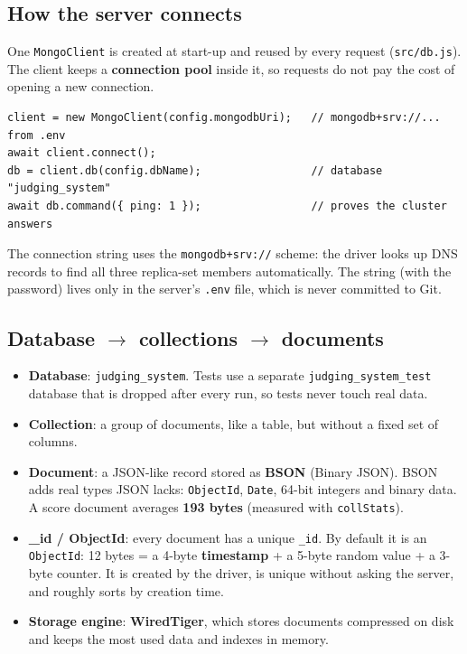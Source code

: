 \documentclass[11pt,a4paper]{article}
\begin{document}
\subsection{How the server connects}
One \texttt{MongoClient} is created at start-up and reused by every request (\texttt{src/db.js}). The client keeps a
\textbf{connection pool} inside it, so requests do not pay the cost of opening a new connection.

\begin{lstlisting}
client = new MongoClient(config.mongodbUri);   // mongodb+srv://... from .env
await client.connect();
db = client.db(config.dbName);                 // database "judging_system"
await db.command({ ping: 1 });                 // proves the cluster answers
\end{lstlisting}

The connection string uses the \texttt{mongodb+srv://} scheme: the driver looks up DNS records to find all three
replica-set members automatically. The string (with the password) lives only in the server's \texttt{.env} file,
which is never committed to Git.

\subsection{Database $\rightarrow$ collections $\rightarrow$ documents}
\begin{itemize}[leftmargin=1.4em]
  \item \textbf{Database}: \texttt{judging\_system}. Tests use a separate \texttt{judging\_system\_test} database that is
        dropped after every run, so tests never touch real data.
  \item \textbf{Collection}: a group of documents, like a table, but without a fixed set of columns.
  \item \textbf{Document}: a JSON-like record stored as \textbf{BSON} (Binary JSON). BSON adds real types JSON lacks:
        \texttt{ObjectId}, \texttt{Date}, 64-bit integers and binary data. A score document averages \textbf{193 bytes}
        (measured with \texttt{collStats}).
  \item \textbf{\_id / ObjectId}: every document has a unique \texttt{\_id}. By default it is an \texttt{ObjectId}:
        12 bytes = a 4-byte \textbf{timestamp} + a 5-byte random value + a 3-byte counter. It is created by the
        driver, is unique without asking the server, and roughly sorts by creation time.
  \item \textbf{Storage engine}: \textbf{WiredTiger}, which stores documents compressed on disk and keeps the most used
        data and indexes in memory.
\end{itemize}
\end{document}
